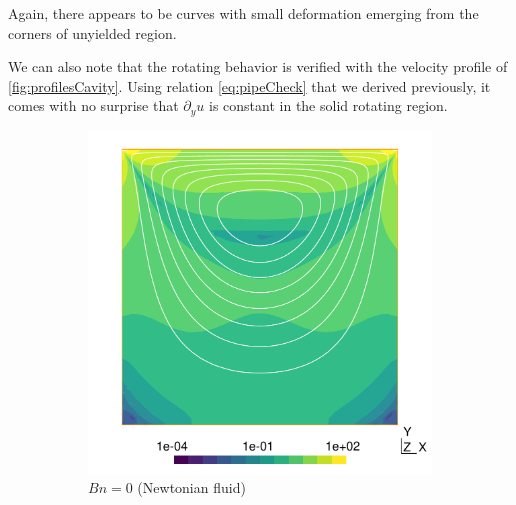 \documentclass[11 pt]{report}
\begin{document}
Again, there appears to be curves with small deformation emerging from the corners of unyielded region. 

We can also note that the rotating behavior is verified with the velocity profile of \cref{fig:profilesCavity}. Using relation \eqref{eq:pipeCheck} that we derived previously, it comes with no surprise that $\partial_y u$ is constant in the solid rotating region.

\pagebreak

\vfill
\begin{figure}[t]
    \centering
    \begin{subfigure}[t]{0.495\textwidth}
        \includegraphics[width=\textwidth]{../figures/cavity_0.pdf}
        \caption{$Bn=0$ (Newtonian fluid)}
        \label{fig:cavity0}
    \end{subfigure}
    \begin{subfigure}[t]{0.495\textwidth}

\end{subfigure}
\end{figure}
\end{document}
